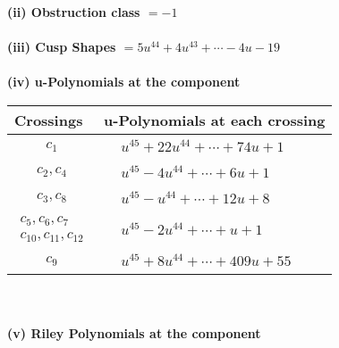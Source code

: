 \documentclass[1p]{elsarticle_modified}
\theoremstyle{definition}
\begin{document}
\flushleft \textbf{(ii) Obstruction class $= -1$}\\~\\
\flushleft \textbf{(iii) Cusp Shapes $= 5 u^{44}+4 u^{43}+\cdots-4 u-19$}\\~\\
\newpage\renewcommand{\arraystretch}{1}
\flushleft \textbf{(iv) u-Polynomials at the component}\newline \\
\begin{tabular}{m{50pt}|m{274pt}}
Crossings & \hspace{64pt}u-Polynomials at each crossing \\
\hline $$\begin{aligned}c_{1}\end{aligned}$$&$\begin{aligned}
&u^{45}+22 u^{44}+\cdots+74 u+1
\end{aligned}$\\
\hline $$\begin{aligned}c_{2},c_{4}\end{aligned}$$&$\begin{aligned}
&u^{45}-4 u^{44}+\cdots+6 u+1
\end{aligned}$\\
\hline $$\begin{aligned}c_{3},c_{8}\end{aligned}$$&$\begin{aligned}
&u^{45}- u^{44}+\cdots+12 u+8
\end{aligned}$\\
\hline $$\begin{aligned}c_{5},c_{6},c_{7}\\c_{10},c_{11},c_{12}\end{aligned}$$&$\begin{aligned}
&u^{45}-2 u^{44}+\cdots+u+1
\end{aligned}$\\
\hline $$\begin{aligned}c_{9}\end{aligned}$$&$\begin{aligned}
&u^{45}+8 u^{44}+\cdots+409 u+55
\end{aligned}$\\
\hline
\end{tabular}\\~\\
\newpage\renewcommand{\arraystretch}{1}
\flushleft \textbf{(v) Riley Polynomials at the component}\newline \\
\end{document}
